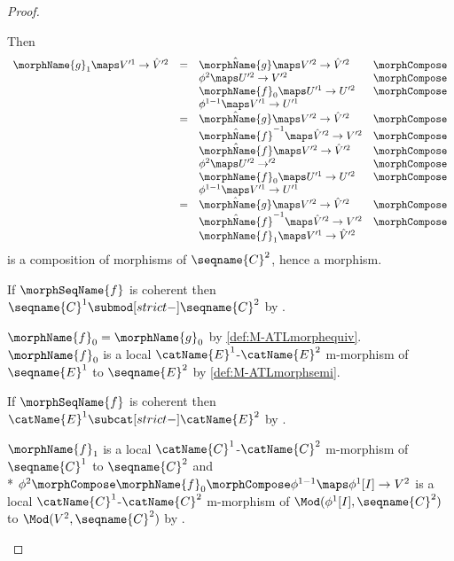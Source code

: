 \documentclass{article}
\begin{document}
\begin{lemma}
\begin{proof}
\begin{description}
Then
\begin{equation*}
\begin{array} {llll}
  \morphName{g}_1 \maps V'^1 \to \hat{V}'^2
  & =
  & \hat{\morphName{g}} \maps V'^2 \to \hat{V}'^2
  & \morphCompose
\\*
  &
  & \phi^2 \maps U'^2 \to V'^2
  & \morphCompose
\\*
  &
  & \morphName{f}_0 \maps U'^1 \to U'^2
  & \morphCompose
\\*
  &
  & \phi^{1-1} \maps V'^1 \to U'^1
\\*
  & =
  & \hat{\morphName{g}} \maps  V'^2 \to \hat{V}'^2
  & \morphCompose
\\*
  &
  & \hat{\morphName{f}}^{-1} \maps  \hat{V}'^2 \to  V'^2
  & \morphCompose
\\*
  &
  & \hat{\morphName{f}} \maps V'^2 \to \hat{V}'^2
  & \morphCompose
\\*
  &
  & \phi^2 \maps  U'^2 \to '^2
  & \morphCompose
\\*
  &
  & \morphName{f}_0 \maps U'^1 \to U'^2
  & \morphCompose
\\*
  &
  & \phi^{1-1} \maps V'^1 \to U'^1
\\*
  & =
  & \hat{\morphName{g}} \maps  V'^2 \to \hat{V}'^2
  & \morphCompose
\\*
  &
  & \hat{\morphName{f}}^{-1} \maps  \hat{V}'^2 \to  V'^2
  & \morphCompose
\\*
  &
  & \morphName{f}_1 \maps V'^1 \to \hat{V}'^2
\end{array}
\end{equation*}
is a composition of morphisms of $\seqname{C}^2$, hence a morphism.

If $\morphSeqName{f}$ is coherent then
$\seqname{C}^1 \submod[strict-] \seqname{C}^2$ by
.

\item[$\seqname{E}^i$ with category:]
$\morphName{f}_0 = \morphName{g}_0$ by \cref{def:M-ATLmorphequiv}.
$\morphName{f}_0$ is a local $\catName{E}^1$-$\catName{E}^2$
m-morphism of $\seqname{E}^1$ to $\seqname{E}^2$ by
\cref{def:M-ATLmorphsemi}.

If $\morphSeqName{f}$ is coherent then
$\catName{E}^1 \subcat[strict-] \catName{E}^2$ by
.

\item[$\seqname{C}^i$ with category:]
$\morphName{f}_1$ is a local $\catName{C}^1$-$\catName{C}^2$ m-morphism
of $\seqname{C}^1$ to $\seqname{C}^2$ and \\*
$
  \phi^2 \morphCompose \morphName{f}_0 \morphCompose \phi^{1-1} \maps
  \phi^1[I] \to V^2
$
is a local $\catName{C}^1$-$\catName{C}^2$ m-morphism of
$\Mod(\phi^1[I],\seqname{C}^2)$ to $\Mod(V^2,\seqname{C}^2)$ by
.


\end{description}
\end{proof}
\end{lemma}
\end{document}
